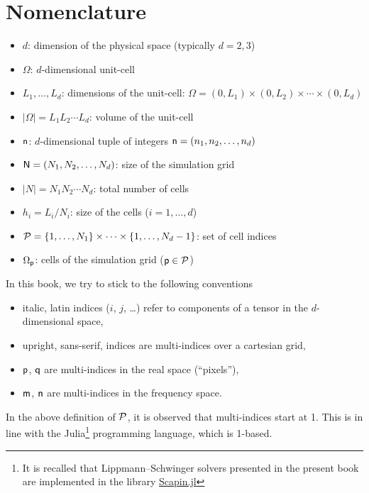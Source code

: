 \chapter{Nomenclature}
\label{cha:20210924084856}

\begin{itemize}
\item \(d\): dimension of the physical space (typically \(d=2, 3\))
\item \(\Omega\): \(d\)-dimensional unit-cell
\item \(L_1,\ldots, L_d\): dimensions of the unit-cell:
  \(\Omega=(0, L_1)\times(0, L_2)\times\cdots\times(0, L_d)\)
\item \(\lvert\Omega\rvert=L_1L_2\cdots L_d\): volume of the unit-cell
\item \(\mathsf{n}\): \(d\)-dimensional tuple of integers
  \(\mathsf{n}=(n_1, n_2, \ldots, n_d)\)
\item \(\mathsf{N}=(N_1, N_2, \ldots, N_d)\): size of the simulation grid
\item \(\lvert N\rvert=N_1N_2\cdots N_d\): total number of cells
\item \(h_i=L_i/N_i\): size of the cells (\(i=1, \ldots, d\))
\item \(\mathcal{P}=\{1, \ldots, N_1\}\times\cdots\times\{1, \ldots, N_d-1\}\):
  set of cell indices
\item \(\Omega_{\mathsf{p}}\): cells of the simulation grid
  (\(\mathsf{p}\in\mathcal{P}\))
\end{itemize}

\begin{remark}
  \label{rem:20210924090334}
  In this book, we try to stick to the following conventions
  \begin{itemize}
  \item italic, latin indices (\(i\), \(j\), \ldots) refer to components of a
    tensor in the \(d\)-dimensional space,
  \item upright, sans-serif, indices are multi-indices over a cartesian grid,
  \item \(\mathsf{p}\), \(\mathsf{q}\) are multi-indices in the real space
    (``pixels''),
  \item \(\mathsf{m}\), \(\mathsf{n}\) are multi-indices in the frequency space.
  \end{itemize}
\end{remark}

\begin{remark}
  \label{rem:20210924090344}
  In the above definition of \(\mathcal{P}\), it is observed that multi-indices
  start at 1. This is in line with the Julia\footnote{It is recalled that
    Lippmann--Schwinger solvers presented in the present book are implemented in
    the library \href{https://github.com/sbrisard/Scapin.jl}{Scapin.jl}}
  programming language, which is 1-based.
\end{remark}

